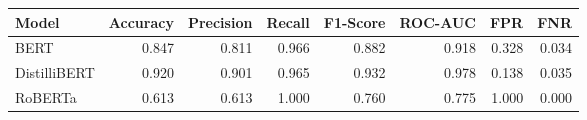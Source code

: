 \begin{tabular}{|l||r|r|r|r|r|r|r|}
\toprule
Model & \textbf{Accuracy} & \textbf{Precision} & Recall & \textbf{F1-Score} & \textbf{ROC-AUC} & \textbf{FPR} & FNR \\
\midrule \midrule
BERT & 0.847 & 0.811 & 0.966 & 0.882 & 0.918 & 0.328 & 0.034 \\
DistilliBERT & 0.920 & 0.901 & 0.965 & 0.932 & 0.978 & 0.138 & 0.035 \\
RoBERTa & 0.613 & 0.613 & 1.000 & 0.760 & 0.775 & 1.000 & 0.000 \\
\bottomrule
\end{tabular}
